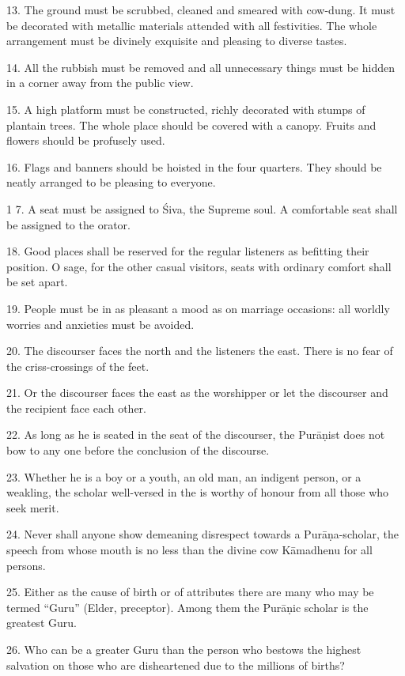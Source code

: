 13. The ground must be scrubbed, cleaned and smeared with cow-dung. It must be
decorated with metallic materials attended with all festivities. The whole
arrangement must be divinely exquisite and pleasing to diverse tastes.

14. All the rubbish must be removed and all unnecessary things must be hidden in
a corner away from the public view.

15. A high platform must be constructed, richly decorated with stumps of
plantain trees. The whole place should be covered with a canopy. Fruits and
flowers should be profusely used.

16. Flags and banners should be hoisted in the four quarters. They should be
neatly arranged to be pleasing to everyone.

1 7. A seat must be assigned to Śiva, the Supreme soul. A comfortable seat shall
be assigned to the orator.

18. Good places shall be reserved for the regular listeners as befitting their
position. O sage, for the other casual visitors, seats with ordinary comfort
shall be set apart.

19. People must be in as pleasant a mood as on marriage occasions: all worldly
worries and anxieties must be avoided.

20. The discourser faces the north and the listeners the east. There is no fear
of the criss-crossings of the feet.

21. Or the discourser faces the east as the worshipper or let the discourser
and the recipient face each other.

22. As long as he is seated in the seat of the discourser, the Purāṇist does not
bow to any one before the conclusion of the discourse.

23. Whether he is a boy or a youth, an old man, an indigent person, or a weakling,
the scholar well-versed in the  is worthy of honour from all those
who seek merit.

24. Never shall anyone show demeaning disrespect towards a Purāṇa-scholar,
the speech from whose mouth is no less than the divine cow Kāmadhenu for all
persons.

25. Either as the cause of birth or of attributes there are many who may be
termed “Guru” (Elder, preceptor). Among them the Purāṇic scholar is the greatest
Guru.

26. Who can be a greater Guru than the person who bestows the highest salvation
on those who are disheartened due to the millions of births?

